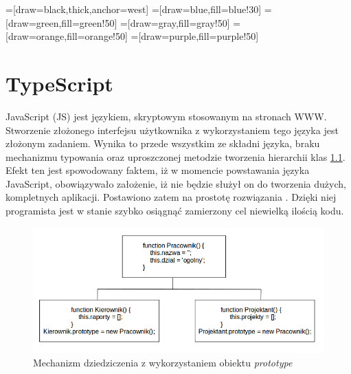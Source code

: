 \usetikzlibrary{trees}
=[draw=black,thick,anchor=west]
=[draw=blue,fill=blue!30]
=[draw=green,fill=green!50]
=[draw=gray,fill=gray!50]
=[draw=orange,fill=orange!50]
=[draw=purple,fill=purple!50]
\chapter{TypeScript}
JavaScript (JS) jest językiem, skryptowym stosowanym na stronach WWW\cite{javascript-book}. Stworzenie złożonego interfejsu użytkownika z wykorzystaniem tego języka jest złożonym zadaniem. Wynika to przede wszystkim ze składni języka, braku mechanizmu typowania oraz uproszczonej metodzie tworzenia hierarchii klas \ref{fig:javascript-inheritance}. Efekt ten jest spowodowany faktem, iż w momencie powstawania języka JavaScript, obowiązywało założenie, iż nie będzie służył on do tworzenia dużych, kompletnych aplikacji. Postawiono zatem na prostotę rozwiązania \cite{javascript-book}. Dzięki niej programista jest w stanie szybko osiągnąć zamierzony cel niewielką ilością kodu.

\begin{figure}[h]
	\includegraphics[width=140mm]{./img/javascript-inheritance.png}
	\centering
	\caption{Mechanizm dziedziczenia z wykorzystaniem obiektu \textit{prototype}}
	\label{fig:javascript-inheritance}
\end{figure}



